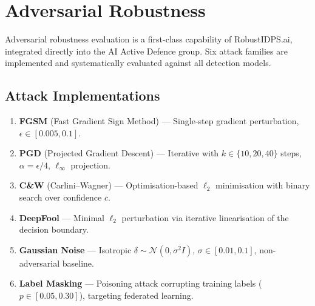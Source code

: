 \documentclass[11pt,a4paper]{article}
\begin{document}
\section{Adversarial Robustness}
\label{sec:adversarial}
Adversarial robustness evaluation is a first-class capability of RobustIDPS.ai, integrated directly into the AI Active Defence group.  Six attack families are implemented and systematically evaluated against all detection models.

\subsection{Attack Implementations}
\begin{enumerate}[leftmargin=*,label=\textbf{\arabic*.},nosep]
  \item \textbf{FGSM} (Fast Gradient Sign Method) --- Single-step gradient perturbation, $\epsilon \in [0.005, 0.1]$.
  \item \textbf{PGD} (Projected Gradient Descent) --- Iterative with $k \in \{10, 20, 40\}$ steps, $\alpha = \epsilon/4$, $\ell_\infty$ projection.
  \item \textbf{C\&W} (Carlini--Wagner) --- Optimisation-based $\ell_2$ minimisation with binary search over confidence $c$.
  \item \textbf{DeepFool} --- Minimal $\ell_2$ perturbation via iterative linearisation of the decision boundary.
  \item \textbf{Gaussian Noise} --- Isotropic $\delta \sim \mathcal{N}(0, \sigma^2 I)$, $\sigma \in [0.01, 0.1]$, non-adversarial baseline.
  \item \textbf{Label Masking} --- Poisoning attack corrupting training labels ($p \in [0.05, 0.30]$), targeting federated learning.
\end{enumerate}
\end{document}
